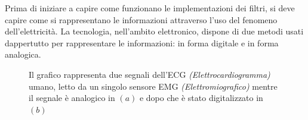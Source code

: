 \documentclass[a4paper, 10pt, final]{article} %
\newcommand{\parenciteit}[2]{\textit{\parencite[#1]{#2}}} %
\begin{document}
    Prima di iniziare a capire come funzionano le implementazioni dei filtri, si deve capire come si rappresentano le informazioni attraverso l'uso del fenomeno dell'elettricit\`{a}.
    La tecnologia, nell'ambito elettronico, dispone di due metodi usati dappertutto per rappresentare le informazioni: in forma digitale e in forma analogica.
    \begin{figure}[H]
        \centering
        \caption{Il grafico rappresenta due segnali dell'ECG \emph{(Elettrocardiogramma)} umano, letto da un singolo sensore EMG \emph{(Elettromiografico)} mentre il segnale \`{e} analogico in $(a)$ e dopo che \`{e} stato digitalizzato in $(b)$ \parenciteit{}{ECGDataThesis}\parenciteit{}{ECGData}}
        \label{fig:AnalogDigital}
    \end{figure}
\end{document}
